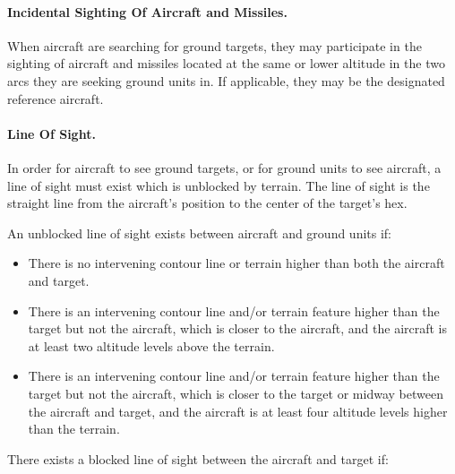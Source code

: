 
\paragraph{Incidental Sighting Of Aircraft and Missiles.} When aircraft are searching for ground targets, they may participate in the sighting of aircraft and missiles located at the same or lower altitude in the two arcs they are seeking ground units in. If applicable, they may be the designated reference aircraft.

\paragraph{Line Of Sight.} In order for aircraft to see ground targets, or for ground units to see aircraft, a line of sight must exist which is unblocked by terrain. The line of sight is the straight line from the aircraft's position to the center of the target's hex.

An unblocked line of sight exists between aircraft and ground units if:

\begin{itemize}
    \item There is no intervening contour line or terrain higher than both the aircraft and target.
    \item There is an intervening contour line and/or terrain feature higher than the target but not the aircraft, which is closer to the aircraft, and the aircraft is at least two altitude levels above the terrain.
    \item There is an intervening contour line and/or terrain feature higher than the target but not the aircraft, which is closer to the target or midway between the aircraft and target, and the aircraft is at least four altitude levels higher than the terrain.
\end{itemize}

There exists a blocked line of sight between the aircraft and target if:

